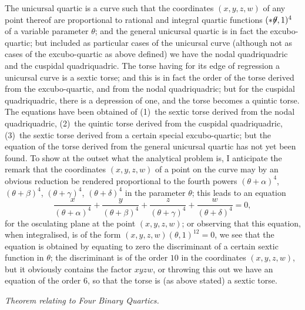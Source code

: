 \documentclass[11pt,a4paper]{article}
\begin{document}
The unicursal quartic is a curve such that the coordinates $(x, y, z, w)$ of any point
thereof are proportional to rational and integral quartic functions $(*\!\!\not\!\theta, 1)^4$
of a variable parameter $\theta$; and the general unicursal quartic is in fact the
excubo-quartic; but included as particular cases of the unicursal curve (although not as
cases of the excubo-quartic as above defined) we have the nodal quadriquadric and the
cuspidal quadriquadric. The torse having for its edge of regression a unicursal curve
is a sextic torse; and this is in fact the order of the torse derived from the
excubo-quartic, and from the nodal quadriquadric; but for the cuspidal quadriquadric,
there is a depression of one, and the torse becomes a quintic torse. The equations
have been obtained of (1)~the sextic torse derived from the nodal quadriquadric,
(2)~the quintic torse derived from the cuspidal quadriquadric, (3)~the sextic torse
derived from a certain special excubo-quartic; but the equation of the torse derived
from the general unicursal quartic has not yet been found. To show at the outset
what the analytical problem is, I anticipate the remark that the coordinates
$(x, y, z, w)$ of a point on the curve may by an obvious reduction be rendered
proportional to the fourth powers $(\theta + \alpha)^4$, $(\theta + \beta)^4$, $(\theta + \gamma)^4$,
$(\theta + \delta)^4$ in the parameter $\theta$; this leads to an equation
\[
\frac{x}{(\theta + \alpha)^4} + \frac{y}{(\theta + \beta)^4}
 + \frac{z}{(\theta + \gamma)^4} + \frac{w}{(\theta + \delta)^4} = 0,
\]
for the osculating plane at the point $(x, y, z, w)$; or observing that this equation,
when integralised, is of the form $(x, y, z, w)(\theta, 1)^{12} = 0$, we see that the
equation is obtained by equating to zero the discriminant of a certain sextic function
in $\theta$; the discriminant is of the order $10$ in the coordinates $(x, y, z, w)$, but
it obviously contains the factor $xyzw$, or throwing this out we have an equation of
the order $6$, so that the torse is (as above stated) a sextic torse.

\bigskip
\begin{center}
\textit{Theorem relating to Four Binary Quartics.}
\end{center}
\end{document}
